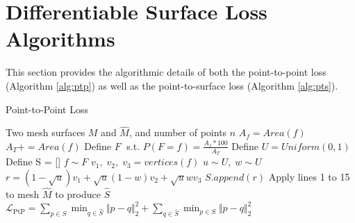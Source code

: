 \documentclass{article}
\begin{document}
\begin{table}[h]
  
  \caption{Mesh-to-Voxel Mapping Reconstruction MSE scores.} \label{table:meshtovoxel}
  \vspace{0.2cm}
  \centering
  
\end{table}


\section{Differentiable Surface Loss Algorithms}

This section provides the algorithmic details of both the point-to-point loss (Algorithm \ref{alg:ptp}) as well as the point-to-surface loss (Algorithm \ref{alg:pts}).


\begin{algorithm}[tbh]
   \caption{Point-to-Point Loss}
   \label{alg:ptp}
\begin{algorithmic}[1]
     Two mesh surfaces $M$ and $\hat{M}$, and number of points $n$
    \STATE $A_f = Area(f)$
    \STATE $A_T \mathrel{{+}{=}} Area(f)$
    \ENDFOR
    \STATE Define $F \;$ s.t. $P(F = f) =  \frac{A_f*100}{A_T}$
    \STATE Define $U = Uniform(0,1)$
    \STATE Define S = [] 
    \STATE $f \sim F$
    \STATE $v_1, \; v_2, \; v_3  = vertices(f)$
    \STATE $u \sim U, \; w \sim U $
    \STATE $r = (1-\sqrt u)v_1 + \sqrt u(1-w)v_2 + \sqrt{u}wv_3$
    \STATE $S.append(r)$
    \ENDFOR
    \STATE Apply lines 1 to 15 to mesh $\hat{M}$ to produce $\hat{S}$
    \STATE $\displaystyle \mathcal{L}_{\text{PtP}}= \sum_{p \in S} \min_{q \in \hat S} \Vert p - q \Vert^2_2 + \sum_{q \in \hat S} \min_{p \in S} \Vert p - q \Vert^2_2$
\end{algorithmic}
\end{algorithm}
\end{document}

